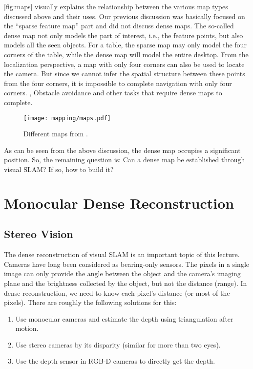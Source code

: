 \autoref{fig:maps} visually explains the relationship between the various map types discussed above and their uses. Our previous discussion was basically focused on the ``sparse feature map'' part and did not discuss dense maps. The so-called dense map not only models the part of interest, i.e., the feature points, but also models all the seen objects. For a table, the sparse map may only model the four corners of the table, while the dense map will model the entire desktop. From the localization perspective, a map with only four corners can also be used to locate the camera. But since we cannot infer the spatial structure between these points from the four corners, it is impossible to complete navigation with only four corners. , Obstacle avoidance and other tasks that require dense maps to complete.

\begin{figure}[!ht]
	\centering
	\texttt{[image: mapping/maps.pdf]}
	\caption{Different maps from \cite{Mur-Artal2015, Labbe2014, Salas-Moreno2013}.}
	\label{fig:maps}
\end{figure}

As can be seen from the above discussion, the dense map occupies a significant position. So, the remaining question is: Can a dense map be established through visual SLAM? If so, how to build it?

\section{Monocular Dense Reconstruction}
\subsection{Stereo Vision}
The dense reconstruction of visual SLAM is an important topic of this lecture. Cameras have long been considered as bearing-only sensors. The pixels in a single image can only provide the angle between the object and the camera's imaging plane and the brightness collected by the object, but not the distance (range). In dense reconstruction, we need to know each pixel's distance (or most of the pixels). There are roughly the following solutions for this:
\begin{enumerate}
	\item Use monocular cameras and estimate the depth using triangulation after motion. 
	\item Use stereo cameras by its disparity (similar for more than two eyes). 
	\item Use the depth sensor in RGB-D cameras to directly get the depth. 
\end{enumerate}

